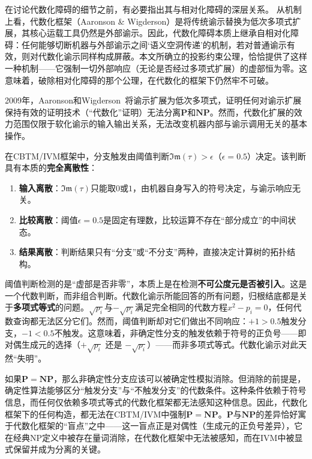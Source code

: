 \documentclass{ctexart}
\begin{document}
在讨论代数化障碍的细节之前，有必要指出其与相对化障碍的深层关系。 从机制上看，代数化框架（Aaronson \& Wigderson）是将传统谕示替换为低次多项式扩展，其核心运载工具仍然是外部谕示。因此，代数化障碍本质上继承自相对化障碍：任何能够切断机器与外部谕示之间‘语义空洞传递’的机制，若对普通谕示有效，则对代数化谕示同样构成屏蔽。本文所确立的投影约束公理，恰恰提供了这样一种机制——它强制一切外部响应（无论是否经过多项式扩展）的虚部恒为零。这意味着，破除相对化障碍的那个公理，在代数化的框架下仍然牢不可破。
		
	2009年，Aaronson和Wigderson~\cite{aaronson2009}将谕示扩展为低次多项式，证明任何对谕示扩展保持有效的证明技术（``代数化''证明）无法分离$\mathbf{P}$和$\mathbf{NP}$。然而，代数化扩展的效力范围仅限于软化谕示的输入输出关系，无法改变机器内部与谕示调用无关的基本操作。
	
	在CBTM/IVM框架中，分支触发由阈值判断$\mathfrak{Im}(\tau) > \epsilon$（$\epsilon=0.5$）决定。该判断具有本质的\textbf{完全离散性}：
	\begin{enumerate}
		\item \textbf{输入离散}：$\mathfrak{Im}(\tau)$只能取$0$或$1$，由机器自身写入的符号决定，与谕示响应无关。
		\item \textbf{比较离散}：阈值$\epsilon=0.5$是固定有理数，比较运算不存在``部分成立''的中间状态。
		\item \textbf{结果离散}：判断结果只有``分支''或``不分支''两种，直接决定计算树的拓扑结构。
	\end{enumerate}
	
	阈值判断检测的是``虚部是否非零''，本质上是在检测\textbf{不可公度元是否被引入}。这是一个代数判断，而非组合判断。代数化谕示所能回答的所有问题，归根结底都是关于\textbf{多项式等式}的问题。$\sqrt{p_i}$与$-\sqrt{p_i}$满足完全相同的代数方程$x^2 - p_i = 0$，任何代数查询都无法区分它们。然而，阈值判断却对它们做出不同响应：$+1 > 0.5$触发分支，$-1 < 0.5$不触发。这意味着，非确定性分支的触发依赖于符号的正负号——即对偶生成元的选择（$+\sqrt{p_i}$ 还是 $-\sqrt{p_i}$）——而非多项式等式。代数化谕示对此天然``失明''。
	
	如果$\mathbf{P} = \mathbf{NP}$，那么非确定性分支应该可以被确定性模拟消除。但消除的前提是，确定性算法能够区分``触发分支''与``不触发分支''的代数条件。这种条件依赖于符号信息，而任何仅依赖多项式等式的代数化框架都无法感知这种信息。因此，代数化框架下的任何构造，都无法在CBTM/IVM中强制$\mathbf{P} = \mathbf{NP}$。$\mathbf{P}$与$\mathbf{NP}$的差异恰好寓于代数化框架的``盲点''之中——这一盲点正是对偶性（生成元的正负号差异），它在经典NP定义中被存在量词消除，在代数化框架中无法被感知，而在IVM中被显式保留并成为分离的关键。
	
\end{document}
